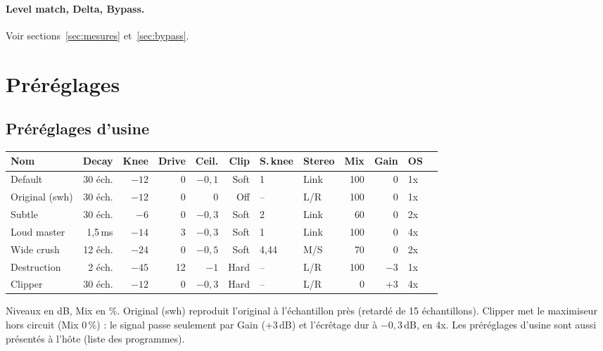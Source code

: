 \documentclass[a4paper,11pt]{article}
\newcommand{\dB}{\,dB}
\begin{document}
\paragraph{Level match, Delta, Bypass.} Voir sections~\ref{sec:mesures} et~\ref{sec:bypass}.

\section{Préréglages}\label{sec:prereglages}

\subsection{Préréglages d'usine}
\begin{center}
\small
\begin{tabular}{@{}l r r r r r l l r r l r@{}}
\toprule
Nom & Decay & Knee & Drive & Ceil. & Clip & S.\,knee & Stereo & Mix & Gain & OS \\
\midrule
Default        & 30 éch.  & $-12$ & 0  & $-0{,}1$ & Soft & 1    & Link & 100 & 0    & 1x \\
Original (swh) & 30 éch.  & $-12$ & 0  & 0        & Off  & --   & L/R  & 100 & 0    & 1x \\
Subtle         & 30 éch.  & $-6$  & 0  & $-0{,}3$ & Soft & 2    & Link & 60  & 0    & 2x \\
Loud master    & 1,5\,ms  & $-14$ & 3  & $-0{,}3$ & Soft & 1    & Link & 100 & 0    & 4x \\
Wide crush     & 12 éch.  & $-24$ & 0  & $-0{,}5$ & Soft & 4,44 & M/S  & 70  & 0    & 2x \\
Destruction    & 2 éch.   & $-45$ & 12 & $-1$     & Hard & --   & L/R  & 100 & $-3$ & 1x \\
Clipper        & 30 éch.  & $-12$ & 0  & $-0{,}3$ & Hard & --   & L/R  & 0   & +3   & 4x \\
\bottomrule
\end{tabular}
\end{center}
Niveaux en dB, Mix en \%. \og Original (swh)\fg{} reproduit l'original à l'échantillon près
(retardé de 15 échantillons). \og Clipper\fg{} met le maximiseur hors circuit (Mix 0\,\%) : le
signal passe seulement par Gain (+3\dB) et l'écrêtage dur à $-0{,}3$\dB, en 4x. Les préréglages
d'usine sont aussi présentés à l'hôte (liste des programmes).
\end{document}

